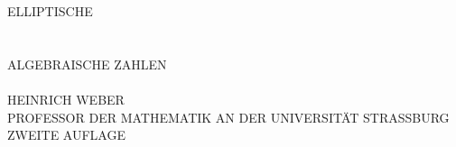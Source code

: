 \vspace*{2cm}
\begin{center}
{\Large ELLIPTISCHE}\\[1.2cm]
{\Large {}}\\[0.8cm]
{\small {}}\\[0.7cm]
{\Large ALGEBRAISCHE ZAHLEN}\\[2cm]
{\small {}}\\[0.8cm]
{\Large HEINRICH WEBER}\\[0.2cm]
{\small PROFESSOR DER MATHEMATIK AN DER UNIVERSITÄT STRASSBURG}\\[2cm]
{\large ZWEITE AUFLAGE}\\[1.2cm]
{\small {}}\\[2.2cm]
{\large {}}\\[0.2cm]
\\[0.2cm]
{\large {}}
\end{center}
